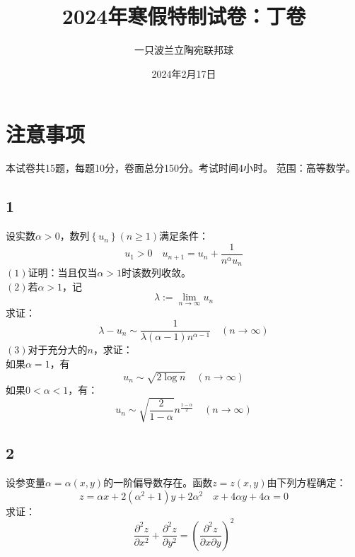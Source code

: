 \documentclass[a4paper,12pt]{article}
\title{2024年寒假特制试卷：丁卷}
\author{一只波兰立陶宛联邦球}
\date{2024年2月17日}
\begin{document}
\maketitle
\section*{注意事项}
本试卷共15题，每题10分，卷面总分150分。考试时间4小时。
范围：高等数学。
\subsection*{1}\noindent 设实数$\alpha>0$，数列$\left\{u_{n}\right\}(n\geq 1)$满足条件：
\begin{equation*}
	u_{1}>0\quad u_{n+1}=u_{n}+\frac{1}{n^{\alpha}u_{n}}
\end{equation*}
\noindent $\left(1\right)$证明：当且仅当$\alpha>1$时该数列收敛。\\
\noindent$\left(2\right)$若$\alpha>1$，记
\begin{equation*}
	\lambda := \lim\limits_{n\rightarrow\infty}u_{n}
\end{equation*}
求证：
\begin{equation*}
	\lambda-u_{n}\sim\frac{1}{\lambda\left(\alpha-1\right)n^{\alpha-1}}\quad\left(n\rightarrow\infty\right)
\end{equation*}
\noindent$\left(3\right)$对于充分大的$n$，求证：\\如果$\alpha=1$，有\begin{equation*}
	u_{n}\sim\sqrt{2\log n}\quad\left(n\rightarrow\infty\right)
\end{equation*}
如果$0<\alpha<1$，有：
\begin{equation*}
	u_{n}\sim\sqrt{\frac{2}{1-\alpha}}n^{\frac{1-\alpha}{2}}\quad\left(n\rightarrow\infty\right)
\end{equation*}
\subsection*{2}\noindent
设参变量$\alpha=\alpha\left(x,y\right)$的一阶偏导数存在。函数$z=z\left(x,y\right)$由下列方程确定：
\begin{equation*}
	z=\alpha x+2\left(\alpha^2+1\right)y+2\alpha^2\quad x+4\alpha y+4\alpha=0
\end{equation*}
求证：
\begin{equation*}
	\frac{\partial^2 z}{\partial x^2}+\frac{\partial^2 z}{\partial y^2}=\left(\frac{\partial^2 z}{\partial x\partial y}\right)^2
\end{equation*}
\end{document}
